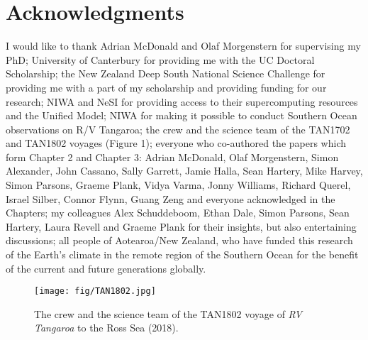 \chapter*{Acknowledgments}

I would like to thank
Adrian McDonald and Olaf Morgenstern for supervising my PhD;
University of Canterbury for providing me with the UC Doctoral Scholarship;
the New Zealand Deep South National Science Challenge for providing me with a
part of my scholarship and providing funding for our research;
NIWA and NeSI for providing access to their supercomputing resources and the Unified Model;
NIWA for making it possible to conduct Southern Ocean observations on R/V
Tangaroa;
the crew and the science team of the TAN1702 and TAN1802 voyages (Figure 1);
everyone who co-authored the papers which form Chapter 2 and Chapter 3:
Adrian McDonald, Olaf Morgenstern, Simon Alexander, John Cassano,
Sally Garrett, Jamie Halla, Sean Hartery, Mike Harvey, Simon Parsons, Graeme Plank,
Vidya Varma, Jonny Williams, Richard Querel, Israel Silber, Connor Flynn, Guang Zeng
and everyone acknowledged in the Chapters;
my colleagues Alex Schuddeboom, Ethan Dale, Simon Parsons, Sean Hartery, Laura Revell and Graeme Plank for their insights, but also entertaining discussions;
all people of Aotearoa/New Zealand, who have funded this research of the Earth's climate
in the remote region of the Southern Ocean for the benefit of the current and
future generations globally.

\vfill

\begin{figure}[h]
\centering
\texttt{[image: fig/TAN1802.jpg]}
\caption{
The crew and the science team of the TAN1802 voyage of \textit{RV Tangaroa}
to the Ross Sea (2018).
}
\end{figure}
